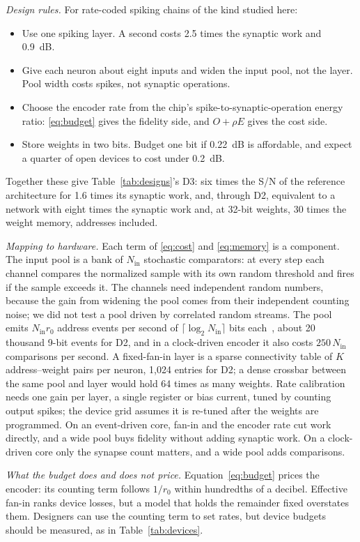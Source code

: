 \documentclass[conference]{IEEEtran}
\newcommand{\dB}{~dB}
\newcommand{\Nin}{N_\mathrm{in}}
\begin{document}
\emph{Design rules.} For rate-coded spiking chains of the kind studied here:
\begin{itemize}
\item Use one spiking layer. A second costs 2.5 times the synaptic work and
0.9\dB.
\item Give each neuron about eight inputs and widen the input pool, not the
layer. Pool width costs spikes, not synaptic operations.
\item Choose the encoder rate from the chip's spike-to-synaptic-operation
energy ratio: \eqref{eq:budget} gives the fidelity side, and
$O + \rho E$ gives the cost side.
\item Store weights in two bits. Budget one bit if 0.22\dB{} is affordable, and
expect a quarter of open devices to cost under 0.2\dB.
\end{itemize}
Together these give Table~\ref{tab:designs}'s D3: six times the S/N of the
reference architecture for 1.6 times its synaptic work, and, through D2,
equivalent to a network with eight times the synaptic work and, at 32-bit
weights, 30 times the weight memory, addresses included.

\emph{Mapping to hardware.} Each term of \eqref{eq:cost} and
\eqref{eq:memory} is a component. The input pool is a bank of $\Nin$
stochastic comparators: at every step each channel compares the normalized
sample with its own random threshold and fires if the sample exceeds it. The
channels need independent random numbers, because the gain from widening the
pool comes from their independent counting noise; we did not test a pool
driven by correlated random streams. The pool emits $\Nin r_0$ address events
per second of $\lceil \log_2 \Nin \rceil$ bits each~\cite{boahen2000aer},
about 20 thousand 9-bit events for D2, and in a clock-driven encoder it also costs
$250\,\Nin$ comparisons per second. A fixed-fan-in layer is a sparse
connectivity table of $K$ address--weight pairs per neuron, 1,024 entries for
D2; a dense crossbar between the same pool and layer would hold 64 times as
many weights. Rate calibration needs one gain per layer, a single register or
bias current, tuned by counting output spikes; the device grid assumes it is
re-tuned after the weights are programmed. On an event-driven core, fan-in and the
encoder rate cut work directly, and a wide pool buys fidelity without adding
synaptic work. On a clock-driven core only the synapse count matters, and a
wide pool adds comparisons.

\emph{What the budget does and does not price.} Equation~\eqref{eq:budget}
prices the encoder: its counting term follows $1/r_0$ within hundredths of a
decibel. Effective fan-in ranks device losses, but a model that holds the
remainder fixed overstates them. Designers can use the counting term to set
rates, but device budgets should be measured, as in Table~\ref{tab:devices}.
\end{document}
